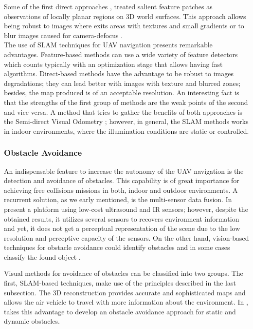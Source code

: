 Some of the first direct approaches \cite{Jin.Favaro.ea:VC:2003}, \cite{Molton.Davison.ea:BMVC:2004} treated salient feature patches as observations of locally planar regions on 3D world surfaces. This approach allows being robust to images where exits areas with textures and small gradients \cite{Lovegrove.Davison.ea:IVS:2011} or to blur images caused for camera-defocus \cite{Newcombe.Lovegrove.ea:ICCV:2011}.\\

The use of SLAM techniques for UAV navigation presents remarkable advantages. Feature-based methods can use a wide variety of feature detectors which counts typically with an optimization stage that allows having fast algorithms. Direct-based methods have the advantage to be robust to images degradations; they can lead better with images with texture and blurred zones; besides, the map produced is of an acceptable resolution. An interesting fact is that the strengths of the first group of methods are the weak points of the second and vice versa. A method that tries to gather the benefits of both approaches is the Semi-direct Visual Odometry \cite{Forster.Pizzoli.ea:ICRA:2014}; however, in general, the SLAM methods works in indoor environments, where the illumination conditions are static or controlled.\\

\subsubsection{Obstacle Avoidance}
An indispensable feature to increase the autonomy of the UAV navigation is the detection and avoidance of obstacles. This capability is of great importance for achieving free collisions missions in both, indoor and outdoor environments. A recurrent solution, as we early mentioned, is the multi-sensor data fusion. In \cite{Gageik.Benz.ea:ACCESS:2015} present a platform using low-cost ultrasound and IR sensors; however, despite the obtained results, it utilizes several sensors to recovers environment information and yet, it does not get a perceptual representation of the scene due to the low resolution and perceptive capacity of the sensors. On the other hand, vision-based techniques for obstacle avoidance could identify obstacles and in some cases classify the found object \cite{Li.Ye.ea:IROS:2016}. 

Visual methods for avoidance of obstacles can be classified into two groups. The first, SLAM-based techniques, make use of the principles described in the last subsection. The 3D reconstruction provides accurate and sophisticated maps and allows the air vehicle to travel with more information about the environment. In \cite{Moreno-Armendariz.Calvo:ICMEAE:2014}, takes this advantage to develop an obstacle avoidance approach for static and dynamic obstacles. 

